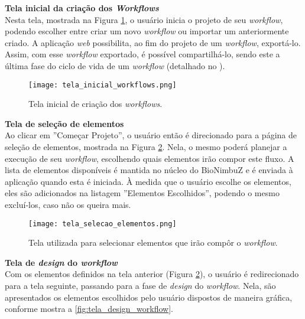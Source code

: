 \noindent
\textbf{Tela inicial da criação dos \textit{Workflows}} \\

\noindent
Nesta tela, mostrada na Figura \ref{fig:tela_inicial_workflows}, o usuário inicia o projeto de seu \textit{workflow}, podendo escolher entre criar um novo \textit{workflow} ou importar um anteriormente criado. A aplicação \textit{web} possibilita, ao fim do projeto de um \textit{workflow}, exportá-lo. Assim, com esse \textit{workflow} exportado, é possível compartilhá-lo, sendo este a última fase do ciclo de vida de um \textit{workflow} (detalhado no ).

\begin{figure}[H]
	\centering
	\texttt{[image: tela\_inicial\_workflows.png]}
	\caption{Tela inicial de criação dos \textit{workflows}.}
	\label{fig:tela_inicial_workflows}
\end{figure}

\noindent
\textbf{Tela de seleção de elementos} \\

\noindent
Ao clicar em ''Começar Projeto'', o usuário então é direcionado para a página de seleção de elementos, mostrada na Figura \ref{fig:tela_selecao_elementos}. Nela, o mesmo poderá planejar a execução de seu \textit{workflow}, escolhendo quais elementos irão compor este fluxo. A lista de elementos disponíveis é mantida no núcleo do BioNimbuZ e é enviada à aplicação quando esta é iniciada. À medida que o usuário escolhe os elementos, eles são adicionados na listagem ''Elementos Escolhidos'', podendo o mesmo excluí-los, caso não os queira mais.

\begin{figure}[H]
	\centering
	\texttt{[image: tela\_selecao\_elementos.png]}
	\caption{Tela utilizada para selecionar elementos que irão compôr o \textit{workflow}.}
	\label{fig:tela_selecao_elementos}
\end{figure}

\noindent
\textbf{Tela de \textit{design} do \textit{workflow}} \\

\noindent
Com os elementos definidos na tela anterior (Figura \ref{fig:tela_selecao_elementos}), o usuário é redirecionado para a tela seguinte, passando para a fase de \textit{design} do \textit{workflow}. Nela, são apresentados os elementos escolhidos pelo usuário dispostos de maneira gráfica, conforme mostra a \ref{fig:tela_design_workflow}.

